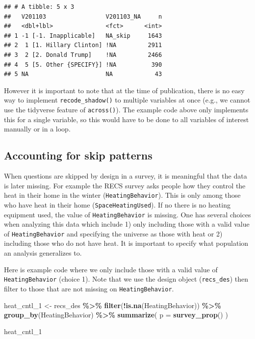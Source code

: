 \documentclass[
]{krantz}
\makeatletter
\newenvironment{Shaded}{\begin{snugshade}}{\end{snugshade}}
\newcommand{\AttributeTok}[1]{\textcolor[rgb]{0.27,0.27,0.27}{#1}}
\newcommand{\FunctionTok}[1]{\textcolor[rgb]{0.27,0.27,0.27}{\textbf{#1}}}
\newcommand{\NormalTok}[1]{#1}
\newcommand{\OtherTok}[1]{\textcolor[rgb]{0.37,0.37,0.37}{#1}}
\newcommand{\SpecialCharTok}[1]{\textcolor[rgb]{0.43,0.43,0.43}{\textbf{#1}}}
\newenvironment{kframe}{%
\medskip{}
\setlength{\fboxsep}{.8em}
 \def\at@end@of@kframe{}%
 \ifinner\ifhmode%
  \def\at@end@of@kframe{\end{minipage}}%
  \begin{minipage}{\columnwidth}%
 \fi\fi%
 \def\FrameCommand##1{\hskip\@totalleftmargin \hskip-\fboxsep
 \colorbox{shadecolor}{##1}\hskip-\fboxsep
     \hskip-\linewidth \hskip-\@totalleftmargin \hskip\columnwidth}%
 \MakeFramed {\advance\hsize-\width
   \@totalleftmargin\z@ \linewidth\hsize
   \@setminipage}}%
 {\par\unskip\endMakeFramed%
 \at@end@of@kframe}
\renewenvironment{Shaded}{\begin{kframe}}{\end{kframe}}
\makeatother
\begin{document}
\begin{verbatim}
## # A tibble: 5 x 3
##   V201103                 V201103_NA     n
##   <dbl+lbl>               <fct>      <int>
## 1 -1 [-1. Inapplicable]   NA_skip     1643
## 2  1 [1. Hillary Clinton] !NA         2911
## 3  2 [2. Donald Trump]    !NA         2466
## 4  5 [5. Other {SPECIFY}] !NA          390
## 5 NA                      NA            43
\end{verbatim}

However it is important to note that at the time of publication, there is no easy way to implement \texttt{recode\_shadow()} to multiple variables at once (e.g., we cannot use the tidyverse feature of \texttt{across()}). The example code above only implements this for a single variable, so this would have to be done to all variables of interest manually or in a loop.

\hypertarget{accounting-for-skip-patterns}{%
\subsection{Accounting for skip patterns}\label{accounting-for-skip-patterns}}

When questions are skipped by design in a survey, it is meaningful that the data is later missing. For example the RECS survey asks people how they control the heat in their home in the winter (\texttt{HeatingBehavior}). This is only among those who have heat in their home (\texttt{SpaceHeatingUsed}). If no there is no heating equipment used, the value of \texttt{HeatingBehavior} is missing. One has several choices when analyzing this data which include 1) only including those with a valid value of \texttt{HeatingBehavior} and specifying the universe as those with heat or 2) including those who do not have heat. It is important to specify what population an analysis generalizes to.

Here is example code where we only include those with a valid value of \texttt{HeatingBehavior} (choice 1). Note that we use the design object (\texttt{recs\_des}) then filter to those that are not missing on \texttt{HeatingBehavior}.

\begin{Shaded}
\begin{Highlighting}[]
\NormalTok{heat\_cntl\_1 }\OtherTok{\textless{}{-}}\NormalTok{ recs\_des }\SpecialCharTok{\%\textgreater{}\%}
  \FunctionTok{filter}\NormalTok{(}\SpecialCharTok{!}\FunctionTok{is.na}\NormalTok{(HeatingBehavior)) }\SpecialCharTok{\%\textgreater{}\%}
  \FunctionTok{group\_by}\NormalTok{(HeatingBehavior) }\SpecialCharTok{\%\textgreater{}\%}
  \FunctionTok{summarize}\NormalTok{(}
    \AttributeTok{p =} \FunctionTok{survey\_prop}\NormalTok{()}
\NormalTok{  )}

\NormalTok{heat\_cntl\_1}
\end{Highlighting}
\end{Shaded}
\end{document}
